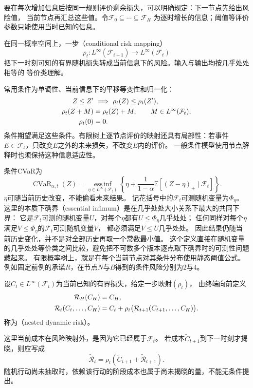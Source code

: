 要在每次增加信息后按同一规则评价剩余损失，可以明确规定：下一节点先给出风险值，
当前节点再汇总这些值。令$\mathcal F_0\subseteq\cdots\subseteq\mathcal F_H$
为逐时增长的信息；阈值等评价参数只能使用当时已知的信息。
\begin{definition}[一步条件风险映射]
\label{def:decision-conditional-risk-mapping}
在同一概率空间上，一步（conditional risk mapping）
\[
  \rho_t:L^\infty(\mathcal F_{t+1})\longrightarrow L^\infty(\mathcal F_t)
\]
把下一时刻可知的有界随机损失转成当前信息下的风险。输入与输出均按几乎处处相等的
等价类理解。
\end{definition}
常用条件为单调性、当前信息下的平移等变性和归一化：
\begin{align}
  Z\leq Z'&\ \Longrightarrow\ \rho_t(Z)\leq\rho_t(Z'),
  \label{eq:decision-conditional-risk-monotonicity}\\
  \rho_t(Z+M)&=\rho_t(Z)+M,\qquad M\in L^\infty(\mathcal F_t),
  \label{eq:decision-conditional-risk-translation}\\
  \rho_t(0)&=0.\notag
\end{align}
条件期望满足这些条件。有限树上逐节点评价的映射还具有局部性：若事件
$E\in\mathcal F_t$，只改变$E$之外的未来损失，不改变$E$内的评价。
一般条件模型使用节点解释时也须保持这种信息适应性。

条件CVaR为
\begin{equation}
  \operatorname{CVaR}_{\alpha,t}(Z)
  =\operatorname*{ess\,inf}_{\eta\in L^\infty(\mathcal F_t)}
    \left\{\eta+\frac{1}{1-\alpha}
      \mathbb E[(Z-\eta)_+\mid\mathcal F_t]\right\}.
  \label{eq:decision-conditional-cvar}
\end{equation}
$\eta$可随当前历史改变，不能偷看未来结果。
记花括号中的$\mathcal F_t$可测随机变量为$\Phi_\eta$。
这里的本质下确界（essential infimum）是在几乎处处大小关系下最大的共同下界：
它是$\mathcal F_t$可测的随机变量$U$，对每个$\eta$都有$U\leq\Phi_\eta$几乎处处；
任何同样对每个$\eta$满足$V\leq\Phi_\eta$的$\mathcal F_t$可测随机变量$V$，
都必须满足$V\leq U$几乎处处。
因此结果仍随当前历史变化，并不是对全部历史再取一个常数最小值。
这个定义直接在随机变量的几乎处处等价类之间比较，避免把不可数多个版本逐点取下确界时的可测性问题藏起来。
有限概率树上，就是在每个当前节点对其条件分布使用静态阈值公式。
例如固定前例的承诺$R$，在节点$N$与$B$得到的条件风险分别为$2$与$4$。

\begin{definition}[嵌套动态风险]
\label{def:decision-nested-dynamic-risk}
设$C_t\in L^\infty(\mathcal F_t)$为当前已知的有界损失，给定一步映射$(\rho_t)$，
由终端向前定义
\begin{align}
  \mathcal R_H(C_H)&=C_H,\notag\\
  \mathcal R_t(C_t,\ldots,C_H)
  &=C_t+\rho_t\bigl(\mathcal R_{t+1}(C_{t+1},\ldots,C_H)\bigr).
  \label{eq:decision-nested-dynamic-risk}
\end{align}
称为（nested dynamic risk）。
\end{definition}
这里当前成本在风险映射外，是因为它已经属于$\mathcal F_t$。
若成本$\widetilde C_{t+1}$到下一时刻才揭晓，则应写成
\[
  \widetilde{\mathcal R}_t
  =\rho_t(\widetilde C_{t+1}+\widetilde{\mathcal R}_{t+1}).
\]
随机行动尚未抽取时，依赖该行动的阶段成本也属于尚未揭晓的量，不能无条件提出。

